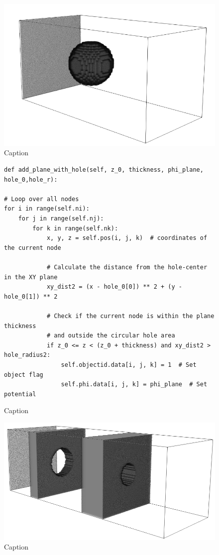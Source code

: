 \begin{figure}[H]
    \centering
\includegraphics[width=0.7\linewidth]{figures/sphere_paraview.png}    
    \caption{Caption}
    \label{fig:enter-label}
\end{figure}




\begin{figure}[H]
    \centering
    \begin{lstlisting}
def add_plane_with_hole(self, z_0, thickness, phi_plane, hole_0,hole_r):

# Loop over all nodes
for i in range(self.ni):
    for j in range(self.nj):
        for k in range(self.nk):
            x, y, z = self.pos(i, j, k)  # coordinates of the current node
            
            # Calculate the distance from the hole-center in the XY plane
            xy_dist2 = (x - hole_0[0]) ** 2 + (y - hole_0[1]) ** 2
            
            # Check if the current node is within the plane thickness
            # and outside the circular hole area
            if z_0 <= z < (z_0 + thickness) and xy_dist2 > hole_radius2:
                self.objectid.data[i, j, k] = 1  # Set object flag
                self.phi.data[i, j, k] = phi_plane  # Set potential
    \end{lstlisting}
    \caption{Caption}
    \label{fig:enter-label}
\end{figure}

\begin{figure}[H]
    \centering
    \includegraphics[width=0.7\linewidth]{figures/GIT_Paraview.png}
    \caption{Caption}
    \label{fig:enter-label}
\end{figure}